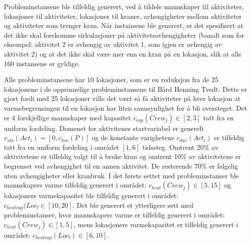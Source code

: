 Probleminstansene ble tilfeldig generert, ved å tildele mannskaper til aktiviteter, lokasjoner til aktiviteter, lokasjoner til kraner, avhengigheter mellom aktiviteter og aktiviteter som trenger kran. Når instansene ble generert, er det spesifisert at det ikke skal forekomme sirkulasjoner på aktivitetsavhengigheter (banalt som for eksempel: aktivitet 2 er avhengig av aktivitet 1, som igjen er avhengig av aktivitet 2) og at det ikke skal være mer enn en kran på en lokasjon, slik at alle 160 instansene er gyldige.

Alle probleminstansene har 10 lokasjoner, som er en reduksjon fra de 25 lokasjonene i de opprinnelige probleminstansene til Bård Henning Tvedt. Dette er gjort fordi med 25 lokasjoner ville det vært så få aktiviteter på hver lokasjon at varmebegrensingen til en lokasjon har liten sannsynlighet for å bli oversteget. Det er 4 forskjellige mannskaper med kapasitet $ c_{cap}(Crew_{j}) \in [2,3] $ tatt fra en uniform fordeling. Domenet for aktivitenes startvariabel er generelt $ v_{sta}(Act_{i}) = [0,c_{hor}(P)] $ og de konstante varighetene $ c_{dur}(Act_{i}) $ er tilfeldig tatt fra en uniform fordeling i området $ [1,6] $ tidssteg. Omtrent 20\% av aktivitetene er tilfeldig valgt til å bruke kran og omtrent 10\% av aktivitetene er begrenset ved avhengighet til en annen aktivitet. De resterende 70\% er følgelig uten avhengigheter eller kranbruk. I det første settet med probleminstanser ble mannskapers varme tilfeldig generert i området: $c_{heat}(Crew_{j}) \in [5,15]$ og lokasjoners varmekapasitet ble tilfeldig generert i området: $c_{heatcap}(Loc_{l} \in [10,20]$. Det ble generert et ytterligere sett med probleminstanser, hvor mannskapers varme er tilfeldig generert i området: $c_{heat}(Crew_{j}) \in [1,5]$, mens lokasjoners varmekapasitet er tilfeldig generert i området: $c_{heatcap}(Loc_{l}) \in [6,10]$.